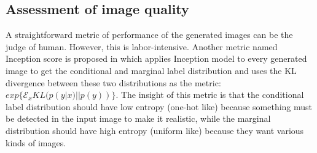 %
%
%

\subsection{Assessment of image quality}
A straightforward metric of performance of the generated images can be the judge of human. However, this is labor-intensive. Another metric named Inception score is proposed in \cite{ImprovedTechnique} which applies Inception model to every generated image to get the conditional and marginal label distribution and uses the KL divergence between these two distributions as the metric: $exp\{\mathcal{E}_x{KL(p(y|x)||p(y))}\}$. The insight of this metric is that the conditional label distribution should have low entropy (one-hot like) because something must be detected in the input image to make it realistic, while the marginal distribution should have high entropy (uniform like) because they want various kinds of images.

